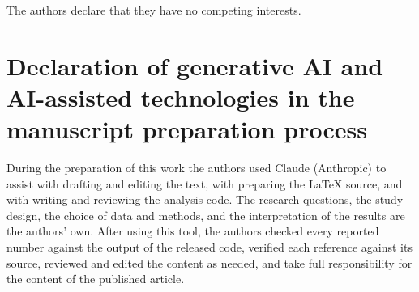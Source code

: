 The authors declare that they have no competing interests.

\section*{Declaration of generative AI and AI-assisted technologies in the manuscript preparation process}

During the preparation of this work the authors used Claude (Anthropic) to
assist with drafting and editing the text, with preparing the \LaTeX{} source,
and with writing and reviewing the analysis code. The research questions, the
study design, the choice of data and methods, and the interpretation of the
results are the authors' own. After using this tool, the authors checked every
reported number against the output of the released code, verified each
reference against its source, reviewed and edited the content as needed, and
take full responsibility for the content of the published article.
